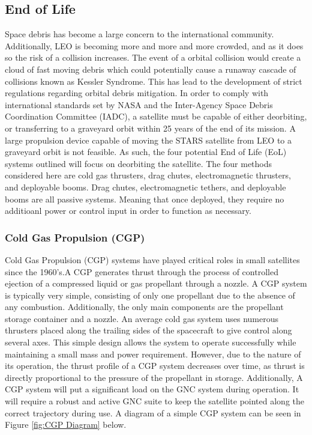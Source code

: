 \documentclass{ece}
\begin{document}
\subsection{End of Life}

Space debris has become a large concern to the international community. Additionally, LEO is becoming more and more and more crowded, and as it does so the risk of a collision increases. The event of a orbital collision would create a cloud of fast moving debris which could potentially cause a runaway cascade of collisions known as Kessler Syndrome.\cite{Kessler_Syndrome}  This has lead to the development of strict regulations regarding orbital debris mitigation. In order to comply with international standards set by NASA and the Inter-Agency Space Debris Coordination Committee (IADC), a satellite must be capable of either deorbiting, or transferring to a graveyard orbit within 25 years of the end of its mission.\cite{STD8719} A large propulsion device capable of moving the STARS satellite from LEO to a graveyard orbit is not feasible. As such, the four potential End of Life (EoL) systems outlined will focus on deorbiting the satellite. The four methods considered here are cold gas thrusters, drag chutes, electromagnetic thrusters, and deployable booms. Drag chutes, electromagnetic tethers, and deployable booms are all passive systems. Meaning that once deployed, they require no additioanl power or control input in order to function as necessary. 
\subsubsection{Cold Gas Propulsion (CGP)}

Cold Gas Propulsion (CGP) systems have played critical roles in small satellites since the 1960's.A CGP generates thrust through the process of controlled ejection of a compressed liquid or gas propellant through a nozzle. A CGP system is typically very simple, consisting of only one propellant due to the absence of any combustion. Additionally, the only main components are the propellant storage container and a nozzle. An average cold gas system uses numerous thrusters placed along the trailing sides of the spacecraft to give control along several axes. This simple design allows the system to operate successfully while maintaining a small mass and power requirement. However, due to the nature of its operation, the thrust profile of a CGP system decreases over time, as thrust is directly proportional to the pressure of the propellant in storage.\cite{Passive_Deorbit} Additionally, A CGP system will put a significant load on the GNC system during operation. It will require a robust and active GNC suite to keep the satellite pointed along the correct trajectory during use. A diagram of a simple CGP system can be seen in Figure \ref{fig:CGP Diagram} below.
\end{document}
